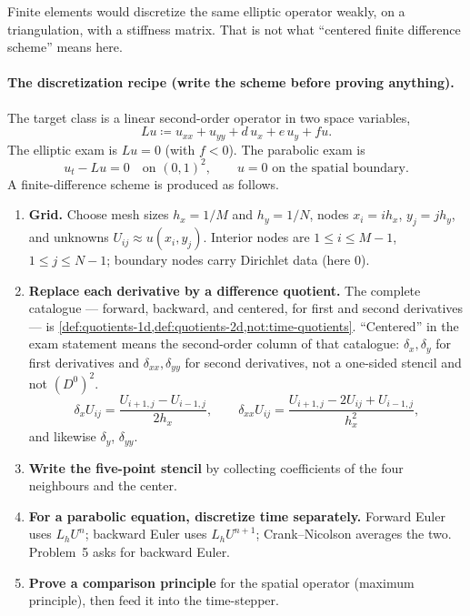 \documentclass[11pt,a4paper]{article}
\begin{document}
Finite elements \cite{brennerscott10} would discretize the same elliptic operator weakly, on a triangulation, with a stiffness matrix. That is not what ``centered finite difference scheme'' means here.

\paragraph{The discretization recipe (write the scheme before proving anything).}

The target class is a linear second-order operator in two space variables,
\[
Lu
\coloneqq
u_{xx}+u_{yy}+d\,u_x+e\,u_y+f u.
\]
The elliptic exam is \(Lu=0\) (with \(f<0\)). The parabolic exam is
\[
u_t-Lu=0
\quad\text{on }(0,1)^2,
\qquad
u=0\text{ on the spatial boundary}.
\]
A finite-difference scheme is produced as follows.

\begin{enumerate}[label=\textup{\arabic*.}]
    \item \textbf{Grid.} Choose mesh sizes \(h_x=1/M\) and \(h_y=1/N\), nodes \(x_i=ih_x\), \(y_j=jh_y\), and unknowns \(U_{ij}\approx u(x_i,y_j)\). Interior nodes are \(1\le i\le M-1\), \(1\le j\le N-1\); boundary nodes carry Dirichlet data (here \(0\)).
    \item \textbf{Replace each derivative by a difference quotient.} The complete catalogue --- forward, backward, and centered, for first and second derivatives --- is \cref{def:quotients-1d,def:quotients-2d,not:time-quotients}. ``Centered'' in the exam statement means the second-order column of that catalogue: \(\delta_x,\delta_y\) for first derivatives and \(\delta_{xx},\delta_{yy}\) for second derivatives, not a one-sided stencil and not \((D^0)^2\).
    \[
    \delta_x U_{ij}
    =
    \frac{U_{i+1,j}-U_{i-1,j}}{2h_x},
    \qquad
    \delta_{xx}U_{ij}
    =
    \frac{U_{i+1,j}-2U_{ij}+U_{i-1,j}}{h_x^2},
    \]
    and likewise \(\delta_y\), \(\delta_{yy}\).
    \item \textbf{Write the five-point stencil} by collecting coefficients of the four neighbours and the center.
    \item \textbf{For a parabolic equation, discretize time separately.} Forward Euler uses \(L_h U^n\); backward Euler uses \(L_h U^{n+1}\); Crank--Nicolson averages the two. Problem~5 asks for backward Euler.
    \item \textbf{Prove a comparison principle} for the spatial operator (maximum principle), then feed it into the time-stepper.
\end{enumerate}
\end{document}
